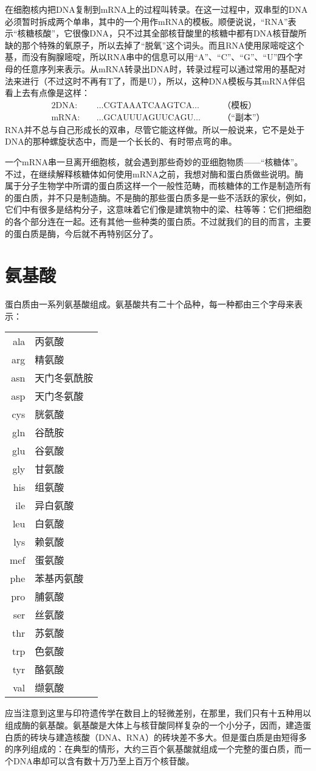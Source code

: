 在细胞核内把DNA复制到mRNA上的过程叫转录。在这一过程中，双串型的DNA必须暂时拆成两个单串，其中的一个用作mRNA的模板。顺便说说，“RNA”表示“核糖核酸”，它很像DNA，只不过其全部核苷酸里的核糖中都有DNA核苷酸所缺的那个特殊的氧原子，所以去掉了“脱氧”这个词头。而且RNA使用尿嘧啶这个基，而没有胸腺嘧啶，所以RNA串中的信息可以用“A”、“C”、“G”、“U”四个字母的任意序列来表示。从mRNA转录出DNA时，转录过程可以通过常用的基配对法来进行（不过这时不再有T了，而是U），所以，这种DNA模板与其mRNA伴侣看上去有点像是这样：
\begin{alignat*}{2}
\mathrm{DNA}:&\quad\dotsc\mathrm{CGTAAATCAAGTCA}\dotsc  &\quad&\text{（模板）}\\
\mathrm{mRNA}:&\quad\dotsc\mathrm{GCAUUUAGUUCAGU}\dotsc &     &\text{（“副本”）}
\end{alignat*}
RNA并不总与自己形成长的双串，尽管它能这样做。所以一般说来，它不是处于DNA的那种螺旋状态中，而是一个长长的、有时带点弯的串。

一个mRNA串一旦离开细胞核，就会遇到那些奇妙的亚细胞物质——“核糖体”。不过，在继续解释核糖体如何使用mRNA之前，我想对酶和蛋白质做些说明。酶属于分子生物学中所谓的蛋白质这样一个一般性范畴，而核糖体的工作是制造所有的蛋白质，并不只是制造酶。不是酶的那些蛋白质多是一些不活跃的家伙，例如，它们中有很多是结构分子，这意味着它们像是建筑物中的梁、柱等等：它们把细胞的各个部分连在一起。还有其他一些种类的蛋白质。不过就我们的目的而言，主要的蛋白质是酶，今后就不再特别区分了。

\section{氨基酸}

蛋白质由一系列氨基酸组成。氨基酸共有二十个品种，每一种都由三个字母来表示：
\begin{longtable}[c]{r!{——}l}
ala & 丙氨酸\\
arg & 精氨酸\\
asn & 天门冬氨酰胺\\
asp & 天门冬氨酸\\
cys & 胱氨酸\\
gln & 谷酰胺\\
glu & 谷氨酸\\
gly & 甘氨酸\\
his & 组氨酸\\
ile & 异白氨酸\\
leu & 白氨酸\\
lys & 赖氨酸\\
mef & 蛋氨酸\\
phe & 苯基丙氨酸\\
pro & 脯氨酸\\
ser & 丝氨酸\\
thr & 苏氨酸\\
trp & 色氨酸\\
tyr & 酪氨酸\\
val & 缬氨酸
\end{longtable}
应当注意到这里与印符遗传学在数目上的轻微差别，在那里，我们只有十五种用以组成酶的氨基酸。氨基酸是大体上与核苷酸同样复杂的一个小分子，因而，建造蛋白质的砖块与建造核酸（DNA、RNA）的砖块差不多大。但是蛋白质是由短得多的序列组成的：在典型的情形，大约三百个氨基酸就组成一个完整的蛋白质，而一个DNA串却可以含有数十万乃至上百万个核苷酸。

